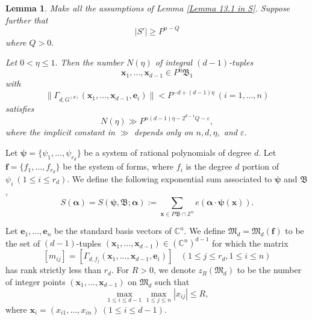 \documentclass[12pt]{amsart}
\newtheorem{lem}[thm]{Lemma}
\theoremstyle{definition}
\theoremstyle{remark}
\numberwithin{equation}{section}
\begin{document}
\begin{lem}\cite[Lemma 14.2]{S}
\label{Lemma 14.2 in S}
Make all the assumptions of Lemma \ref{Lemma 13.1 in S}. Suppose further that
$$
|S'| \geq P^{n-Q}
$$
where $Q>0.$
\iffalse
Then the number $N$ of $(d-1)$-tuples of integer points $\mathbf{x}_1, ..., \mathbf{x}_{d-1} \in P \mathfrak{B}_1$
with
$$
\| \Gamma_{d, G^{(d)}} ( \mathbf{x}_1, ... , \mathbf{x}_{d-1}, \mathbf{e}_i  ) \| < P^{-1 } \ (i=1,..., s)
$$
satisfies
$$
N \gg P^{ s(d-1) - 2^{d-1} Q - \varepsilon },
$$
where the implicit constant in $\gg$ depends only on $n,d, \varepsilon$.
\end{lem}

\begin{lem}\cite[Lemma 14.2]{S}
\label{Lemma 14.2 in S}
Make the same assumptions as in Lemma \ref{Lemma 13.2 in S}. Suppose $\eta > 0$, and
$$
\eta  \leq 1.
$$
\fi
Let $0 < \eta \leq 1.$
Then the number $N(\eta)$ of integral $(d-1)$-tuples
$$
\mathbf{x}_1, ..., \mathbf{x}_{d-1} \in P^{\eta} \mathfrak{B}_1
$$
with
$$
\|  \Gamma_{d, G^{(d)}} ( \mathbf{x}_1, ... , \mathbf{x}_{d-1}, \mathbf{e}_i  ) \| < P^{-d + (d-1) \eta } \ (i=1,..., n)
$$
satisfies
$$
N(\eta) \gg P^{ n(d-1)\eta - 2^{d-1} Q - \varepsilon },
$$
where the implicit constant in $\gg$ depends only on $n,d, \eta,$ and $\varepsilon$.
\end{lem}

Let $\boldsymbol{\psi} = \{ \psi_1, ..., \psi_{r_d}  \}$ be a system of rational polynomials of degree $d$.
Let $\mathbf{f} = \{ f_1, ..., f_{r_d} \}$ be the system of forms, where $f_i$ is the degree $d$ portion of
$\psi_i \ (1 \leq i \leq {r_d} )$.
We define the following exponential sum associated to  $\boldsymbol{\psi}$ and $\mathfrak{B}$,
\begin{equation}
\label{def of S 1}
S( \boldsymbol{\alpha}) = S( \boldsymbol{\psi},  \mathfrak{B} ;\boldsymbol{\alpha}) := \sum_{\mathbf{x} \in P \mathfrak{B} \cap \mathbb{Z}^n} e( \boldsymbol{\alpha}  \cdot \boldsymbol{\psi} (\mathbf{x}) ).
\end{equation}

Let $\mathbf{e}_1, ..., \mathbf{e}_n$ be the standard basis vectors of $\mathbb{C}^n$.
We define $\mathfrak{M}_d = \mathfrak{M}_d (\mathbf{f}^{}) $ to be the set of $(d-1)$-tuples $(\mathbf{x}_1, ..., \mathbf{x}_{d-1} ) \in (\mathbb{C}^n)^{d-1}$ for which the matrix
$$
[m_{ij}] = [ \Gamma_{d, f_{j}} ( \mathbf{x}_1, ... , \mathbf{x}_{d-1}, \mathbf{e}_i ) ] \ \ \ \  (1 \leq j \leq r_d, 1\leq i \leq n)
$$
has rank strictly less than $r_d$. For $R>0$, we denote $z_{R} (\mathfrak{M}_d)$ to be the number of integer points $(\mathbf{x}_1, ..., \mathbf{x}_{d-1} )$ on
$\mathfrak{M}_d$ such that $$\max_{1 \leq i \leq d-1} \max_{1 \leq j \leq n}  | x_{ij} | \leq R,$$
where $\mathbf{x}_i = (x_{i1}, ..., x_{in}) \ (1 \leq i \leq d-1)$.
\end{document}
